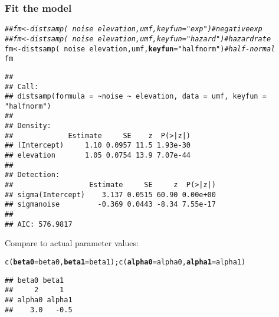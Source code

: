 \documentclass[color=usenames,dvipsnames]{beamer}\usepackage[]{graphicx}\usepackage[]{color}
\makeatletter
\newcommand{\hlstr}[1]{\textcolor[rgb]{0.749,0.012,0.012}{#1}}%
\newcommand{\hlcom}[1]{\textcolor[rgb]{0.514,0.506,0.514}{\textit{#1}}}%
\newcommand{\hlopt}[1]{\textcolor[rgb]{0,0,0}{#1}}%
\newcommand{\hlstd}[1]{\textcolor[rgb]{0,0,0}{#1}}%
\newcommand{\hlkwb}[1]{\textcolor[rgb]{0,0.341,0.682}{#1}}%
\newcommand{\hlkwc}[1]{\textcolor[rgb]{0,0,0}{\textbf{#1}}}%
\newcommand{\hlkwd}[1]{\textcolor[rgb]{0.004,0.004,0.506}{#1}}%
\newenvironment{kframe}{%
 \def\at@end@of@kframe{}%
 \ifinner\ifhmode%
  \def\at@end@of@kframe{\end{minipage}}%
  \begin{minipage}{\columnwidth}%
 \fi\fi%
 \def\FrameCommand##1{\hskip\@totalleftmargin \hskip-\fboxsep
 \colorbox{shadecolor}{##1}\hskip-\fboxsep
     \hskip-\linewidth \hskip-\@totalleftmargin \hskip\columnwidth}%
 \MakeFramed {\advance\hsize-\width
   \@totalleftmargin\z@ \linewidth\hsize
   \@setminipage}}%
 {\par\unskip\endMakeFramed%
 \at@end@of@kframe}
\newenvironment{knitrout}{}{} %
\makeatother
\begin{document}
\begin{frame}[fragile]
  \frametitle{Fit the model}
  \footnotesize
\begin{knitrout}\tiny
{}\color{fgcolor}\begin{kframe}
\begin{alltt}
\hlcom{## fm <- distsamp(~noise ~elevation, umf, keyfun="exp")     # negative exp}
\hlcom{## fm <- distsamp(~noise ~elevation, umf, keyfun="hazard")  # hazard rate}
\hlstd{fm} \hlkwb{<-} \hlkwd{distsamp}\hlstd{(}\hlopt{~}\hlstd{noise} \hlopt{~}\hlstd{elevation, umf,} \hlkwc{keyfun}\hlstd{=}\hlstr{"halfnorm"}\hlstd{)}   \hlcom{# half-normal}
\hlstd{fm}
\end{alltt}
\begin{verbatim}
## 
## Call:
## distsamp(formula = ~noise ~ elevation, data = umf, keyfun = "halfnorm")
## 
## Density:
##             Estimate     SE    z  P(>|z|)
## (Intercept)     1.10 0.0957 11.5 1.93e-30
## elevation       1.05 0.0754 13.9 7.07e-44
## 
## Detection:
##                  Estimate     SE     z  P(>|z|)
## sigma(Intercept)    3.137 0.0515 60.90 0.00e+00
## sigmanoise         -0.369 0.0443 -8.34 7.55e-17
## 
## AIC: 576.9817
\end{verbatim}
\end{kframe}
\end{knitrout}
\pause
\vfill
Compare to actual parameter values:
\vspace{-6pt}
\begin{knitrout}\tiny
{}\color{fgcolor}\begin{kframe}
\begin{alltt}
\hlkwd{c}\hlstd{(}\hlkwc{beta0}\hlstd{=beta0,} \hlkwc{beta1}\hlstd{=beta1);} \hlkwd{c}\hlstd{(}\hlkwc{alpha0}\hlstd{=alpha0,} \hlkwc{alpha1}\hlstd{=alpha1)}
\end{alltt}
\begin{verbatim}
## beta0 beta1 
##     2     1
## alpha0 alpha1 
##    3.0   -0.5
\end{verbatim}
\end{kframe}
\end{knitrout}
\end{frame}
\end{document}
